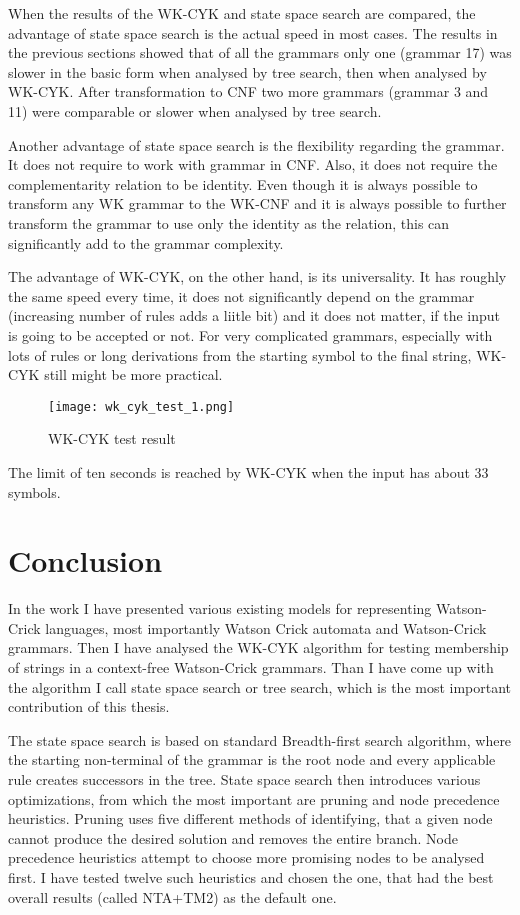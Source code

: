 When the results of the WK-CYK and state space search are compared, the advantage of state space search is the actual speed in most cases. The results in the previous sections showed that of all the grammars only one (grammar 17) was slower in the basic form when analysed by tree search, then when analysed by WK-CYK. After transformation to CNF two more grammars (grammar 3 and 11) were comparable or slower when analysed by tree search.

Another advantage of state space search is the flexibility regarding the grammar. It does not require to work with grammar in CNF. Also, it does not require the complementarity relation to be identity. Even though it is always possible to transform any WK grammar to the WK-CNF and it is always possible to further transform the grammar to use only the identity as the relation, this can significantly add to the grammar complexity.

The advantage of WK-CYK, on the other hand, is its universality. It has roughly the same speed every time, it does not significantly depend on the grammar (increasing number of rules adds a liitle bit) and it does not matter, if the input is going to be accepted or not. For very complicated grammars, especially with lots of rules or long derivations from the starting symbol to the final string, WK-CYK still might be more practical.

\begin{figure}[h]
  \centering
  \texttt{[image: wk\_cyk\_test\_1.png]}
  \caption{WK-CYK test result}
  \label{fig:wk_cyk_test1}
\end{figure}

The limit of ten seconds is reached by WK-CYK when the input has about 33 symbols.

\chapter{Conclusion}
In the work I have presented various existing models for representing Watson-Crick languages, most importantly Watson Crick automata and Watson-Crick grammars. Then I have analysed the WK-CYK algorithm for testing membership of strings in a context-free Watson-Crick grammars. Than I have come up with the algorithm I call state space search or tree search, which is the most important contribution of this thesis.

The state space search is based on standard Breadth-first search algorithm, where the starting non-terminal of the grammar is the root node and every applicable rule creates successors in the tree. State space search then introduces various optimizations, from which the most important are pruning and node precedence heuristics. Pruning uses five different methods of identifying, that a given node cannot produce the desired solution and removes the entire branch. Node precedence heuristics attempt to choose more promising nodes to be analysed first. I have tested twelve such heuristics and chosen the one, that had the best overall results (called NTA+TM2) as the default one.

